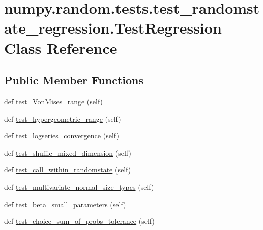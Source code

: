\hypertarget{classnumpy_1_1random_1_1tests_1_1test__randomstate__regression_1_1TestRegression}{}\section{numpy.\+random.\+tests.\+test\+\_\+randomstate\+\_\+regression.\+Test\+Regression Class Reference}
\label{classnumpy_1_1random_1_1tests_1_1test__randomstate__regression_1_1TestRegression}
\subsection*{Public Member Functions}
\begin{DoxyCompactItemize}
\item 
def \hyperlink{classnumpy_1_1random_1_1tests_1_1test__randomstate__regression_1_1TestRegression_ae76d105d256a69526f9133ac1a758689}{test\+\_\+\+Von\+Mises\+\_\+range} (self)
\item 
def \hyperlink{classnumpy_1_1random_1_1tests_1_1test__randomstate__regression_1_1TestRegression_a8a3b94b23fd9e5b4ab7f1b2ab0776ae5}{test\+\_\+hypergeometric\+\_\+range} (self)
\item 
def \hyperlink{classnumpy_1_1random_1_1tests_1_1test__randomstate__regression_1_1TestRegression_ad7b5bac06590969089ba6ceb108d3751}{test\+\_\+logseries\+\_\+convergence} (self)
\item 
def \hyperlink{classnumpy_1_1random_1_1tests_1_1test__randomstate__regression_1_1TestRegression_a0a291a902cc997c2ebd017aa9b9e9c37}{test\+\_\+shuffle\+\_\+mixed\+\_\+dimension} (self)
\item 
def \hyperlink{classnumpy_1_1random_1_1tests_1_1test__randomstate__regression_1_1TestRegression_af78f8985032bbb7bf54d1548935a9bd1}{test\+\_\+call\+\_\+within\+\_\+randomstate} (self)
\item 
def \hyperlink{classnumpy_1_1random_1_1tests_1_1test__randomstate__regression_1_1TestRegression_a45c8a22c2c9bec0b6861dc1fea3c89cb}{test\+\_\+multivariate\+\_\+normal\+\_\+size\+\_\+types} (self)
\item 
def \hyperlink{classnumpy_1_1random_1_1tests_1_1test__randomstate__regression_1_1TestRegression_a497ae7bb91b4015e6b746fef61f6a07e}{test\+\_\+beta\+\_\+small\+\_\+parameters} (self)
\item 
def \hyperlink{classnumpy_1_1random_1_1tests_1_1test__randomstate__regression_1_1TestRegression_a83c88906b99b16e79050fc421a984f18}{test\+\_\+choice\+\_\+sum\+\_\+of\+\_\+probs\+\_\+tolerance} (self)

\end{DoxyCompactItemize}
